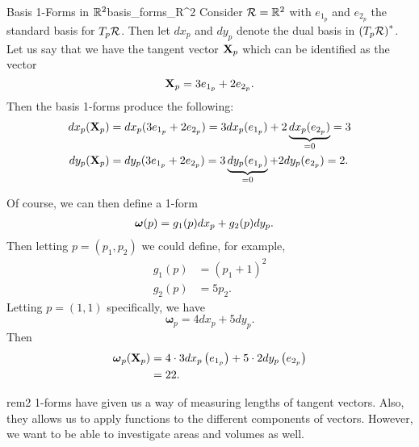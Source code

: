 \begin{ex}{Basis 1-Forms in $\mathbb{R}^2$}{basis_forms_R^2}
Consider $\mathcal{R} = \mathbb{R}^2$ with $e_{1_p}$ and $e_{2_p}$ the standard basis for $T_p\mathcal{R}$. Then let $dx_p$ and $dy_p$ denote the dual basis in $\left(T_p\mathcal{R}\right)^*$. Let us say that we have the tangent vector $\mathbf{X}_p$ which can be identified as the vector
\[
\mathbf{X}_p = 3e_{1_p}+2e_{2_p}.
\]
Then the basis 1-forms produce the following:
\begin{align*}
    dx_p(\mathbf{X}_p)&=dx_p(3e_{1_p}+2e_{2_p})=3dx_p(e_{1_p})+2\underbrace{dx_p(e_{2_p})}_{=0}=3\\
    dy_p(\mathbf{X}_p)&=dy_p(3e_{1_p}+2e_{2_p})=3\underbrace{dy_p(e_{1_p})}_{=0}+2dy_p(e_{2_p})=2.\\
\end{align*}
        \begin{center}
        \end{center}
        Of course, we can then define a 1-form 
        \begin{align*}
        \boldsymbol{\omega}(p)&=g_1(p)dx_p+g_2(p)dy_p.
        \end{align*}
        Then letting $p=(p_1,p_2)$ we could define, for example,
        \begin{align*}
            g_1(p)&=(p_1+1)^2\\
            g_2(p)&=5p_2.
        \end{align*}
        Letting $p=(1,1)$ specifically, we have
        \[
        \boldsymbol{\omega}_{p}=4dx_p+5dy_p.
        \]
        Then
        \begin{align*}
        \boldsymbol{\omega}_p(\mathbf{X}_p)&=4\cdot 3dx_p\left(e_{1_p}\right)+5\cdot 2dy_p\left(e_{2_p}\right)\\
        &=22.
        \end{align*}
        \end{ex}
        
        \begin{remark}{}{rem2}
        1-forms have given us a way of measuring lengths of tangent vectors.  Also, they allows us to apply functions to the different components of vectors.  However, we want to be able to investigate areas and volumes as well. 
        \end{remark}
        
